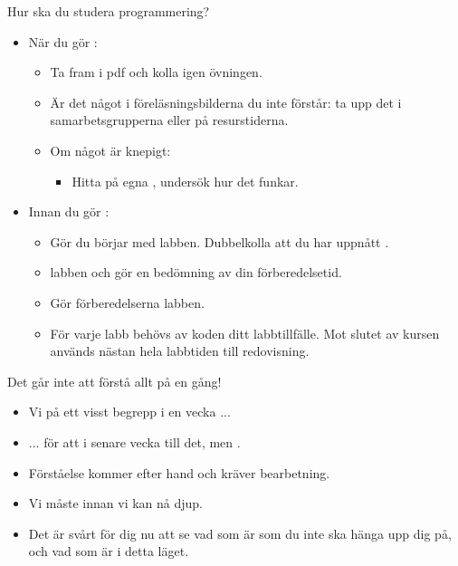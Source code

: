 \begin{SlideExtra}{Hur ska du studera programmering?}
\SlideFontSmall
  \begin{itemize}\SlideFontSmall
\item När du gör :
\begin{itemize}\SlideFontSmall
\item Ta fram  i pdf och kolla igen  övningen.
\item Är det något i föreläsningsbilderna du inte förstår: ta upp det i samarbetsgrupperna eller på resurstiderna.
\item Om något är knepigt:
\begin{itemize}\SlideFontSmall
\item Hitta på egna , undersök hur det funkar.
\end{itemize}
\end{itemize}

\item Innan du gör :
\begin{itemize}\SlideFontSmall
\item Gör    du börjar med labben. Dubbelkolla att du har uppnått .
\item {}    labben och gör en bedömning av din förberedelsetid.
\item Gör förberedelserna  labben.
\item För varje labb behövs  av koden  ditt labbtillfälle. Mot slutet av kursen används nästan hela labbtiden till redovisning.
\end{itemize}
\end{itemize}

\end{SlideExtra}

\begin{SlideExtra}{Det går inte att förstå allt på en gång!}
\begin{itemize}
\item Vi  på ett visst begrepp  i en vecka ...

\item ... för att i senare vecka  till det, men .

\item Förståelse kommer efter hand och kräver bearbetning.

\item Vi måste  innan vi kan nå djup.

\item Det är svårt för dig nu att se vad som är  som du inte ska hänga upp dig på, och vad som är  i detta läget.  
\end{itemize}

\end{SlideExtra}


